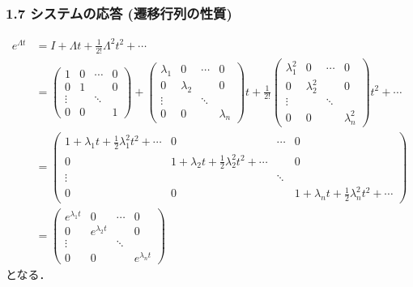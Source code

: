 \documentclass[10pt]{beamer}
\begin{document}
\begin{frame}[t]
\frametitle{1.7 システムの応答 (遷移行列の性質)}
 

{\small
\begin{align}
 e^{\Lambda t}
 &= I + \Lambda t + \frac{1}{2!}\Lambda^2t^2 + \cdots \nonumber\\
 &=
 \left(\begin{array}{cccc}
        1      & 0 & \cdots & 0 \\
  0      & 1 &        & 0 \\
  \vdots &   & \ddots &   \\
  0      & 0 &        & 1
       \end{array}\right) +
 \left(\begin{array}{cccc}
        \lambda_1 & 0         & \cdots & 0 \\
  0         & \lambda_2 &        & 0 \\
  \vdots    &           & \ddots &   \\
  0         & 0         &        & \lambda_n
       \end{array}\right) t +
 \frac{1}{2!}
 \left(\begin{array}{cccc}
        \lambda_1^2 & 0         & \cdots & 0 \\
  0         & \lambda_2^2 &        & 0 \\
  \vdots    &           & \ddots &   \\
  0         & 0         &        & \lambda_n^2
       \end{array}\right) t^2 + \cdots \nonumber\\
 &=
 \left(\begin{array}{cccc}
        1 + \lambda_1 t + \frac{1}{2} \lambda_1^2 t^2 + \cdots & 0 & \cdots & 0 \\
  0      & 1 + \lambda_2 t + \frac{1}{2} \lambda_2^2 t^2 + \cdots &        & 0 \\
  \vdots &   & \ddots &   \\
  0      & 0 &        & 1 + \lambda_n t + \frac{1}{2} \lambda_n^2 t^2 + \cdots
       \end{array}\right)
\nonumber\\
 &=
 \left(\begin{array}{cccc}
        e^{\lambda_1 t} & 0               & \cdots & 0 \\
  0               & e^{\lambda_2 t} &        & 0 \\
  \vdots          &                 & \ddots & \\
  0               & 0               &        & e^{\lambda_n t}
       \end{array}\right)
 
\end{align}
}
となる．
\end{frame}
\end{document}
